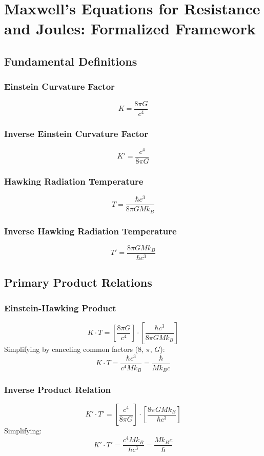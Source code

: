 ﻿\documentclass[12pt]{article}
\begin{document}
\section{Maxwell's Equations for Resistance and Joules: Formalized Framework}

\subsection{Fundamental Definitions}

\subsubsection{Einstein Curvature Factor}
$$K = \frac{8\pi G}{c^4}$$

\subsubsection{Inverse Einstein Curvature Factor}
$$K' = \frac{c^4}{8\pi G}$$

\subsubsection{Hawking Radiation Temperature}
$$T = \frac{\hbar c^3}{8\pi GMk_B}$$

\subsubsection{Inverse Hawking Radiation Temperature}
$$T' = \frac{8\pi GMk_B}{\hbar c^3}$$

\subsection{Primary Product Relations}

\subsubsection{Einstein-Hawking Product}
$$K \cdot T = \left[\frac{8\pi G}{c^4}\right]\cdot\left[\frac{\hbar c^3}{8\pi GMk_B}\right]$$
Simplifying by canceling common factors ($8$, $\pi$, $G$):
$$K \cdot T = \frac{\hbar c^3}{c^4Mk_B} = \frac{\hbar}{Mk_Bc}$$

\subsubsection{Inverse Product Relation}
$$K' \cdot T' = \left[\frac{c^4}{8\pi G}\right]\cdot\left[\frac{8\pi GMk_B}{\hbar c^3}\right]$$
Simplifying:
$$K' \cdot T' = \frac{c^4Mk_B}{\hbar c^3} = \frac{Mk_Bc}{\hbar}$$
\end{document}
